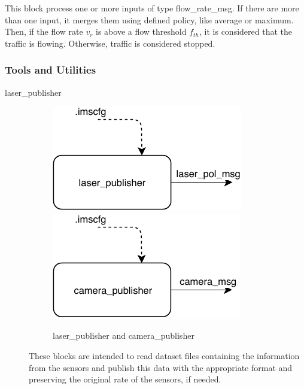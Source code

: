 \begin{description}
This block process one or more inputs of type flow\_rate\_msg. If there are more than one input, it merges them using defined policy, like average or maximum. Then, if the flow rate $v_{r}$ is above a flow threshold $f_{th}$, it is considered that the traffic is flowing. Otherwise, traffic is considered stopped.

\end{description}
\subsubsection{Tools and Utilities}
\begin{description}

\item[laser\_publisher] \hfill
\begin{figure}[ht!]
\centering
\includegraphics[scale=1]{fig/3/laser_publisher.pdf}
\includegraphics[scale=1]{fig/3/camera_publisher.pdf}
\caption{laser\_publisher and camera\_publisher}
\label{sensors_publishers}
\end{figure}

These blocks are intended to read dataset files containing the information from the sensors and publish this data with the appropriate format and preserving the original rate of the sensors, if needed.



\end{description}
